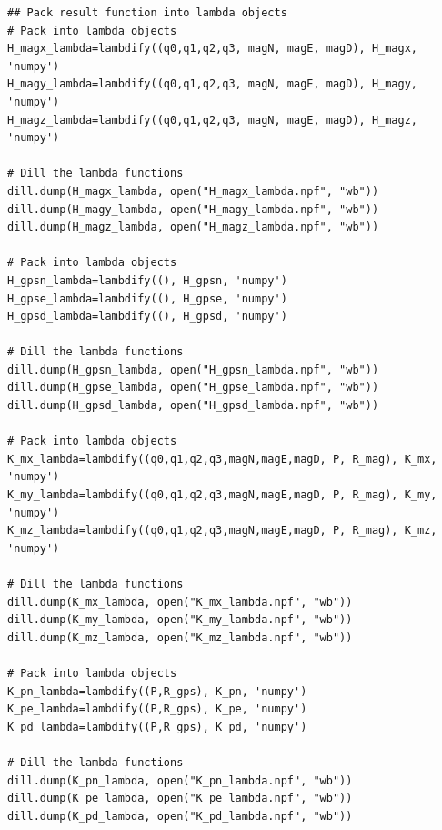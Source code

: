 \begin{lstlisting}
## Pack result function into lambda objects
# Pack into lambda objects
H_magx_lambda=lambdify((q0,q1,q2,q3, magN, magE, magD), H_magx, 'numpy')
H_magy_lambda=lambdify((q0,q1,q2,q3, magN, magE, magD), H_magy, 'numpy')
H_magz_lambda=lambdify((q0,q1,q2,q3, magN, magE, magD), H_magz, 'numpy')

# Dill the lambda functions
dill.dump(H_magx_lambda, open("H_magx_lambda.npf", "wb"))
dill.dump(H_magy_lambda, open("H_magy_lambda.npf", "wb"))
dill.dump(H_magz_lambda, open("H_magz_lambda.npf", "wb"))

# Pack into lambda objects
H_gpsn_lambda=lambdify((), H_gpsn, 'numpy')
H_gpse_lambda=lambdify((), H_gpse, 'numpy')
H_gpsd_lambda=lambdify((), H_gpsd, 'numpy')

# Dill the lambda functions
dill.dump(H_gpsn_lambda, open("H_gpsn_lambda.npf", "wb"))
dill.dump(H_gpse_lambda, open("H_gpse_lambda.npf", "wb"))
dill.dump(H_gpsd_lambda, open("H_gpsd_lambda.npf", "wb"))

# Pack into lambda objects
K_mx_lambda=lambdify((q0,q1,q2,q3,magN,magE,magD, P, R_mag), K_mx, 'numpy')
K_my_lambda=lambdify((q0,q1,q2,q3,magN,magE,magD, P, R_mag), K_my, 'numpy')
K_mz_lambda=lambdify((q0,q1,q2,q3,magN,magE,magD, P, R_mag), K_mz, 'numpy')

# Dill the lambda functions
dill.dump(K_mx_lambda, open("K_mx_lambda.npf", "wb"))
dill.dump(K_my_lambda, open("K_my_lambda.npf", "wb"))
dill.dump(K_mz_lambda, open("K_mz_lambda.npf", "wb"))

# Pack into lambda objects
K_pn_lambda=lambdify((P,R_gps), K_pn, 'numpy')
K_pe_lambda=lambdify((P,R_gps), K_pe, 'numpy')
K_pd_lambda=lambdify((P,R_gps), K_pd, 'numpy')

# Dill the lambda functions
dill.dump(K_pn_lambda, open("K_pn_lambda.npf", "wb"))
dill.dump(K_pe_lambda, open("K_pe_lambda.npf", "wb"))
dill.dump(K_pd_lambda, open("K_pd_lambda.npf", "wb"))
\end{lstlisting}
